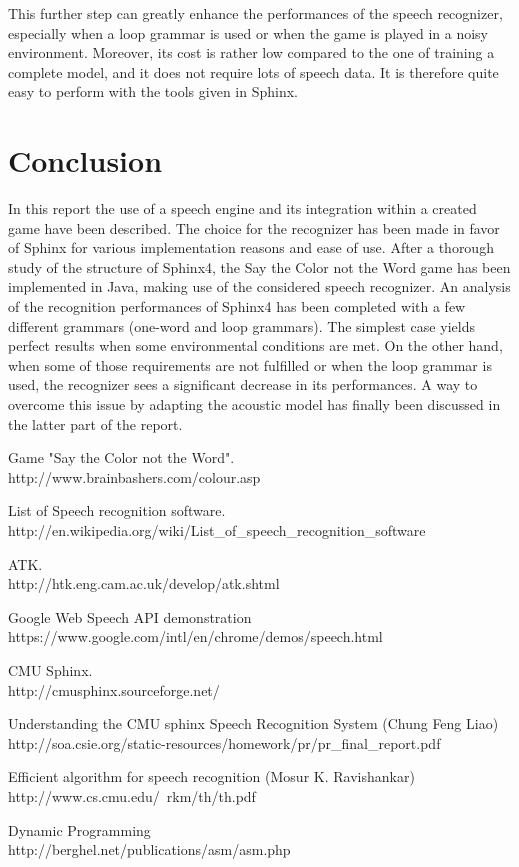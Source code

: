 \documentclass{report}
\begin{document}
This further step can greatly enhance the performances of the speech recognizer, especially when a loop grammar is used or when the game is played in a noisy environment. Moreover, its cost is rather low compared to the one of training a complete model, and it does not require lots of speech data. It is therefore quite easy to perform with the tools given in Sphinx.

\section*{Conclusion}
In this report the use of a speech engine and its integration within a created game have been described. The choice for the recognizer has been made in favor of Sphinx for various implementation reasons and ease of use. After a thorough study of the structure of Sphinx4, the Say the Color not the Word game has been implemented in Java, making use of the considered speech recognizer. An analysis of the recognition performances of Sphinx4 has been completed with a few different grammars (one-word and loop grammars). The simplest case yields perfect results when some environmental conditions are met. On the other hand, when some of those requirements are not fulfilled or when the loop grammar is used, the recognizer sees a significant decrease in its performances. A way to overcome this issue by adapting the acoustic model has finally been discussed in the latter part of the report.

\begin{thebibliography}{40}
 Game "Say the Color not the Word". \\ http://www.brainbashers.com/colour.asp

 List of Speech recognition software. \\ http://en.wikipedia.org/wiki/List\_of\_speech\_recognition\_software

 ATK. \\ http://htk.eng.cam.ac.uk/develop/atk.shtml

 Google Web Speech API demonstration \\ https://www.google.com/intl/en/chrome/demos/speech.html

 CMU Sphinx. \\ http://cmusphinx.sourceforge.net/

 Understanding the CMU sphinx Speech Recognition System (Chung Feng Liao) \\ http://soa.csie.org/static-resources/homework/pr/pr\_final\_report.pdf

 Efficient algorithm for speech recognition (Mosur K. Ravishankar) \\ http://www.cs.cmu.edu/~rkm/th/th.pdf

 Dynamic Programming \\ http://berghel.net/publications/asm/asm.php

\end{thebibliography}
\end{document}
